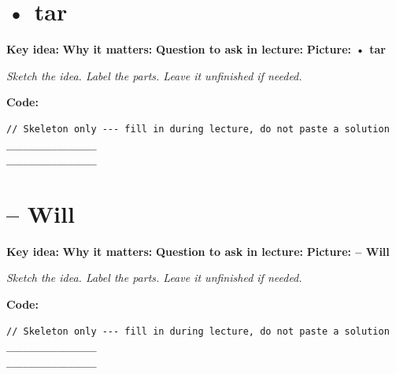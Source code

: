 \documentclass[12pt]{article}
\newcommand{\deflabel}[1]{\noindent\textcolor{slotdef}{\textbf{#1}}}
\newcommand{\drawlabel}[1]{\noindent\textcolor{slotdraw}{\textbf{#1}}}
\begin{document}
\section{• tar}
\Needspace{0.16\textheight}
\deflabel{Key idea:}
\vspace{1.1em}
\Needspace{0.16\textheight}
\deflabel{Why it matters:}
\vspace{1.1em}
\Needspace{0.16\textheight}
\deflabel{Question to ask in lecture:}
\vspace{1.1em}
\Needspace{0.28\textheight}
\drawlabel{Picture: • tar}
{\color{slotdraw}
\begin{framed}
\color{ink}
\begin{minipage}[t][0.22\textheight]{\textwidth}
\vspace{0.4em}
\textit{Sketch the idea. Label the parts. Leave it unfinished if needed.}
\end{minipage}
\end{framed}
}
\vspace{1em}
\Needspace{0.18\textheight}
\drawlabel{Code:}
\begin{lstlisting}
// Skeleton only --- fill in during lecture, do not paste a solution
________________
________________
\end{lstlisting}
\vspace{1em}
\section{– Will}
\Needspace{0.16\textheight}
\deflabel{Key idea:}
\vspace{1.1em}
\Needspace{0.16\textheight}
\deflabel{Why it matters:}
\vspace{1.1em}
\Needspace{0.16\textheight}
\deflabel{Question to ask in lecture:}
\vspace{1.1em}
\Needspace{0.28\textheight}
\drawlabel{Picture: – Will}
{\color{slotdraw}
\begin{framed}
\color{ink}
\begin{minipage}[t][0.22\textheight]{\textwidth}
\vspace{0.4em}
\textit{Sketch the idea. Label the parts. Leave it unfinished if needed.}
\end{minipage}
\end{framed}
}
\vspace{1em}
\Needspace{0.18\textheight}
\drawlabel{Code:}
\begin{lstlisting}
// Skeleton only --- fill in during lecture, do not paste a solution
________________
________________
\end{lstlisting}
\vspace{1em}
\end{document}
